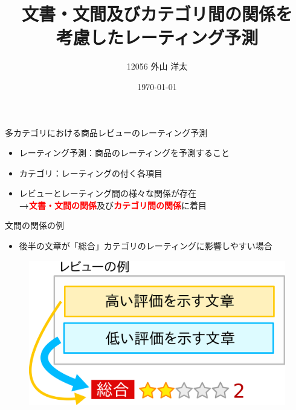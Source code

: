 \documentclass[aspectratio=43,unicode,10pt]{beamer}
\title{文書・文間及びカテゴリ間の関係を\\考慮したレーティング予測}
\institute{知能数理研究室}
\author{12056 外山 洋太}
\date{\today}
\newcommand{\fire}[1]{\textcolor{red}{\textbf{#1}}}
\newcommand{\arrow}{\textcolor{ttiblue}{\textbf{→}}\hspace{1ex}}
\begin{document}
\begin{frame}
\titlepage
\end{frame}

\begin{frame}{多カテゴリにおける商品レビューのレーティング予測}{}
  \begin{itemize}
    \item レーティング予測：商品のレーティングを予測すること
    \item カテゴリ：レーティングの付く各項目
    \item レビューとレーティング間の様々な関係が存在 \\
          \arrow \fire{文書・文間の関係}及び\fire{カテゴリ間の関係}に着目
  \end{itemize}
  \begin{figure}
    \fboxsep=2mm
  \end{figure}
\end{frame}

\begin{frame}{文間の関係の例}{}
  \begin{itemize}
    \item 後半の文章が「総合」カテゴリのレーティングに影響しやすい場合
  \end{itemize}
  \begin{figure}
    \includegraphics[width=0.8\linewidth]
                    {fig/global_relations_among_sentences.png}
  \end{figure}
\end{frame}
\end{document}
